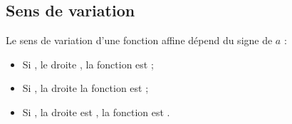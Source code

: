 \documentclass[12pt,a4paper]{article}
\begin{document}
\subsection{Sens de variation}

\begin{myprop}
	Le sens de variation d'une fonction affine dépend du signe de $a$ :
	\begin{itemize}
		\item Si , le droite , la fonction est ;
		\item Si , la droite  la fonction est ;
		\item Si , la droite est , la fonction est .
	\end{itemize}
\end{myprop}
\end{document}
